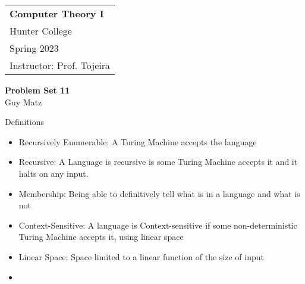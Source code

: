 \documentclass[12pt]{scrbook}
\author{Guy Matz}
\begin{document}
  \begin{tabular}{p{15.5cm}}
    {\large \textbf{Computer Theory I}} \\
    Hunter College \\
    Spring 2023  \\
    Instructor: Prof. Tojeira\\
    \hline
  \end{tabular}
  \begin{center}
    {\Large \textbf{Problem Set 11}}
    \vspace{2mm}\\
    Guy Matz
  \end{center}

  Definitions
  \begin{itemize}
    \item Recursively Enumerable: A Turing Machine accepts the language
    \item Recursive: A Language is recursive is some Turing Machine accepts
      it and it halts on any input.
    \item Membership: Being able to definitively tell what is in a language
      and what is not
    \item Context-Sensitive: A language is Context-sensitive if some
      non-deterministic Turing Machine accepts it, using linear space
    \item Linear Space: Space limited to a linear function of the size of input
    \item
  \end{itemize}
\end{document}
